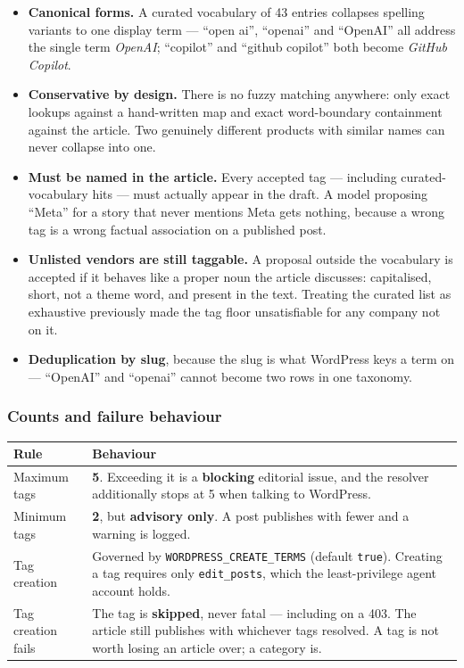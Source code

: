 \documentclass[11pt,a4paper]{article}
\newcommand{\var}[1]{\texttt{\small\hyphenpenalty=0\exhyphenpenalty=0\relax #1}}
\newcommand{\us}{\_\discretionary{}{}{}}
\newcommand{\brk}{\hyphenpenalty=0\exhyphenpenalty=0\relax}
\newcommand{\code}[1]{\texttt{\small\brk #1}}
\begin{document}
\begin{itemize}[leftmargin=1.2em,itemsep=0.2em]
  \item \textbf{Canonical forms.} A curated vocabulary of 43 entries collapses
    spelling variants to one display term --- ``open ai'', ``openai'' and ``OpenAI''
    all address the single term \emph{OpenAI}; ``copilot'' and ``github copilot''
    both become \emph{GitHub Copilot}.
  \item \textbf{Conservative by design.} There is no fuzzy matching anywhere:
    only exact lookups against a hand-written map and exact word-boundary
    containment against the article. Two genuinely different products with similar
    names can never collapse into one.
  \item \textbf{Must be named in the article.} Every accepted tag --- including
    curated-vocabulary hits --- must actually appear in the draft. A model
    proposing ``Meta'' for a story that never mentions Meta gets nothing, because
    a wrong tag is a wrong factual association on a published post.
  \item \textbf{Unlisted vendors are still taggable.} A proposal outside the
    vocabulary is accepted if it behaves like a proper noun the article
    discusses: capitalised, short, not a theme word, and present in the text.
    Treating the curated list as exhaustive previously made the tag floor
    unsatisfiable for any company not on it.
  \item \textbf{Deduplication by slug}, because the slug is what WordPress keys a
    term on --- ``OpenAI'' and ``openai'' cannot become two rows in one taxonomy.
\end{itemize}

\subsubsection*{Counts and failure behaviour}

\begin{center}
\small
\begin{tabularx}{\textwidth}{@{}p{5.0cm} >{\RaggedRight}X@{}}
\toprule
\textbf{Rule} & \textbf{Behaviour} \\
\midrule
Maximum tags & \textbf{5}. Exceeding it is a \textbf{blocking} editorial issue,
  and the resolver additionally stops at 5 when talking to WordPress. \\
Minimum tags & \textbf{2}, but \textbf{advisory only}. A post publishes with fewer
  and a warning is logged. \\
Tag creation & Governed by \var{WORDPRESS\us CREATE\us TERMS} (default
  \code{true}). Creating a tag requires only \code{edit\_posts}, which the
  least-privilege agent account holds. \\
Tag creation fails & The tag is \textbf{skipped}, never fatal --- including on a
  403. The article still publishes with whichever tags resolved. A tag is not
  worth losing an article over; a category is. \\
\bottomrule
\end{tabularx}
\end{center}
\end{document}
